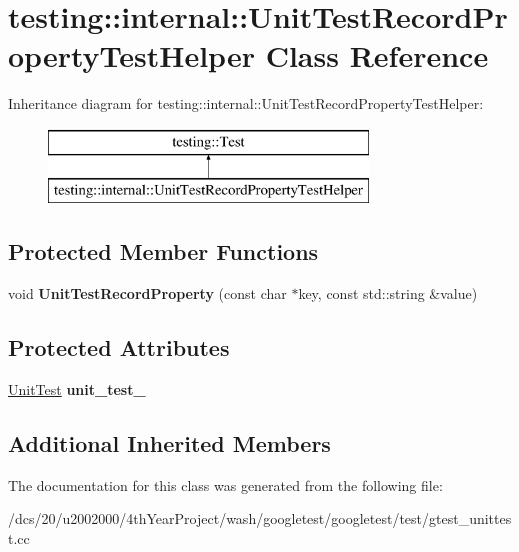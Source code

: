 \hypertarget{classtesting_1_1internal_1_1UnitTestRecordPropertyTestHelper}{}\section{testing\+:\+:internal\+:\+:Unit\+Test\+Record\+Property\+Test\+Helper Class Reference}
\label{classtesting_1_1internal_1_1UnitTestRecordPropertyTestHelper}
Inheritance diagram for testing\+:\+:internal\+:\+:Unit\+Test\+Record\+Property\+Test\+Helper\+:\begin{figure}[H]
\begin{center}
\leavevmode
\includegraphics[height=2.000000cm]{classtesting_1_1internal_1_1UnitTestRecordPropertyTestHelper}
\end{center}
\end{figure}
\subsection*{Protected Member Functions}
\begin{DoxyCompactItemize}
\item 
\mbox{\label{classtesting_1_1internal_1_1UnitTestRecordPropertyTestHelper_a9c5432d080faf13a1db6baff0a2944f4}} 
void {\bfseries Unit\+Test\+Record\+Property} (const char $\ast$key, const std\+::string \&value)
\end{DoxyCompactItemize}
\subsection*{Protected Attributes}
\begin{DoxyCompactItemize}
\item 
\mbox{\label{classtesting_1_1internal_1_1UnitTestRecordPropertyTestHelper_a415e13a354d3b8bd97db96aae5ef5df1}} 
\mbox{\hyperlink{classtesting_1_1UnitTest}{Unit\+Test}} {\bfseries unit\+\_\+test\+\_\+}
\end{DoxyCompactItemize}
\subsection*{Additional Inherited Members}


The documentation for this class was generated from the following file\+:\begin{DoxyCompactItemize}
\item 
/dcs/20/u2002000/4th\+Year\+Project/wash/googletest/googletest/test/gtest\+\_\+unittest.\+cc\end{DoxyCompactItemize}
